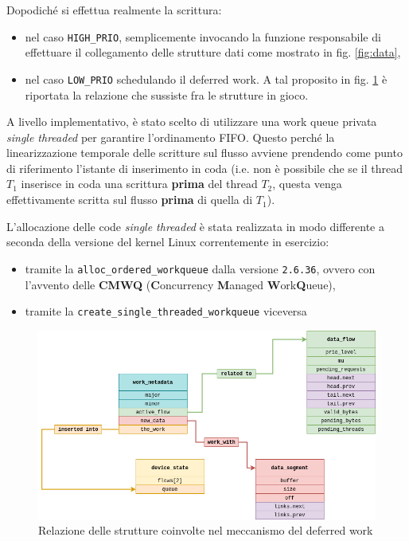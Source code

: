 \documentclass{article}
\begin{document}
Dopodiché si effettua realmente la scrittura:
\begin{itemize}
        \item nel caso \texttt{HIGH\_PRIO}, semplicemente invocando la funzione responsabile di effettuare il collegamento delle strutture dati come mostrato in fig. \ref{fig:data},
        \item nel caso \texttt{LOW\_PRIO} schedulando il deferred work. A tal proposito in fig. \ref{fig:deferred_work} è riportata la relazione che sussiste fra le strutture in gioco.
\end{itemize}

A livello implementativo, è stato scelto di utilizzare una work queue privata \textit{single threaded} per garantire l'ordinamento FIFO. Questo perché la linearizzazione temporale delle scritture sul flusso avviene prendendo come punto di riferimento l'istante di inserimento in coda (i.e. non è possibile che se il thread $T_1$ inserisce in coda una scrittura \textbf{prima} del thread $T_2$, questa venga effettivamente scritta sul flusso \textbf{prima} di quella di $T_1$).

L'allocazione delle code \textit{single threaded} è stata realizzata in modo differente a seconda della versione del kernel Linux correntemente in esercizio:
\begin{itemize}
        \item tramite la \texttt{alloc\_ordered\_workqueue} dalla versione \texttt{2.6.36}, ovvero con l'avvento delle \textbf{CMWQ} (\textbf{C}oncurrency \textbf{M}anaged \textbf{W}ork\textbf{Q}ueue),
        \item tramite la \texttt{create\_single\_threaded\_workqueue} viceversa
\end{itemize}

\begin{figure}[htbp]
        \centering
        \includegraphics[width=.8\textwidth]{deferred_work}
        \caption{Relazione delle strutture coinvolte nel meccanismo del deferred work}
        \label{fig:deferred_work}
\end{figure}
\end{document}
